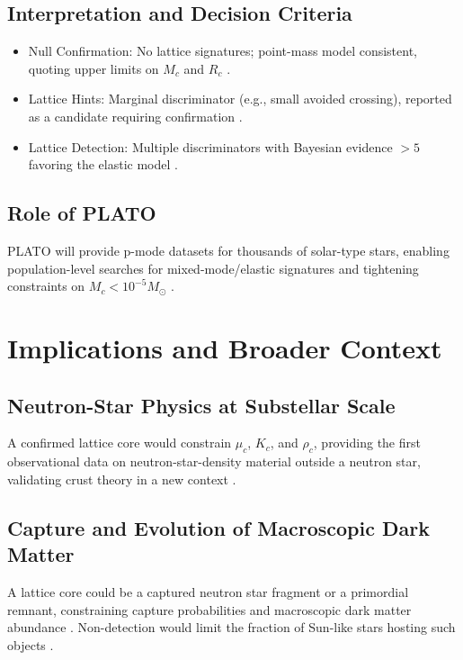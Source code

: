 \documentclass{article}
\begin{document}
\subsection{Interpretation and Decision Criteria}

\begin{itemize}
\item Null Confirmation: No lattice signatures; point-mass model consistent, quoting upper limits on $M_c$ and $R_c$ \citep{bellinger2025}.
\item Lattice Hints: Marginal discriminator (e.g., small avoided crossing), reported as a candidate requiring confirmation \citep{aerts2010}.
\item Lattice Detection: Multiple discriminators with Bayesian evidence $>5$ favoring the elastic model \citep{lund2017}.
\end{itemize}

\subsection{Role of PLATO}

PLATO will provide p-mode datasets for thousands of solar-type stars, enabling population-level searches for mixed-mode/elastic signatures and tightening constraints on $M_c < 10^{-5} M_\odot$ \citep{lund2017}.

\section{Implications and Broader Context}

\subsection{Neutron-Star Physics at Substellar Scale}

A confirmed lattice core would constrain $\mu_c$, $K_c$, and $\rho_c$, providing the first observational data on neutron-star-density material outside a neutron star, validating crust theory in a new context \citep{markovic1995, kunitomo2021}.

\subsection{Capture and Evolution of Macroscopic Dark Matter}

A lattice core could be a captured neutron star fragment or a primordial remnant, constraining capture probabilities and macroscopic dark matter abundance \citep{witten1984, clemente2025}. Non-detection would limit the fraction of Sun-like stars hosting such objects \citep{farag2024}.
\end{document}
